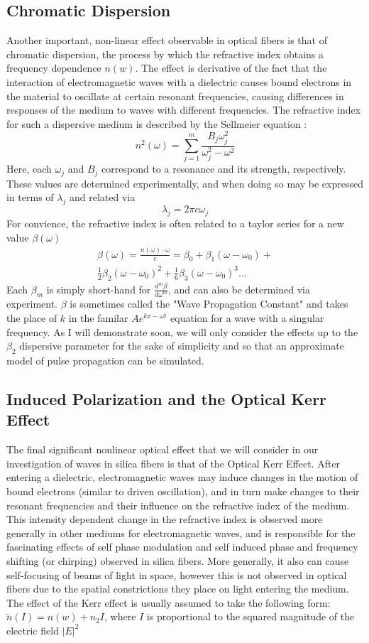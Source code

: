 \documentclass[10pt, a4paper, twocolumn]{article} %
\begin{document}
\subsection{Chromatic Dispersion}
Another important, non-linear effect observable in optical fibers is that of chromatic dispersion, the process by which the refractive index obtains a frequency dependence $n(w)$. The effect is derivative of the fact that the interaction of electromagnetic waves with a dielectric causes bound electrons in the material to oscillate at certain resonant frequencies, causing differences in responses of the medium to waves with different frequencies. The refractive index for such a dispersive medium is described by the Sellmeier equation \cite{AgrawalChap2}:
$$n^2(\omega) = \sum_{j=1}^m \frac{B_j \omega_j^2}{\omega_j^2 - \omega^2}$$
Here, each $\omega_j$ and $B_j$ correspond to a resonance and its strength, respectively. These values are determined experimentally, and when doing so may be expressed in terms of $\lambda_j$ and related via 
$$\lambda_j = 2\pi c \omega_j$$
For convience, the refractive index is often related to a taylor series for a new value $\beta(\omega)$
\begin{align*}
    \beta (\omega) = \frac{n(\omega)\cdot\omega}{c} = \beta_0 + \beta_1 (\omega - \omega_0) +\\ \frac{1}{2} \beta_2 (\omega - \omega_0)^2 + \frac{1}{6} \beta_3 (\omega - \omega_0)^3...
\end{align*}
Each $\beta_m$ is simply short-hand for $\frac{d^m\beta}{d\omega ^m}$, and can also be determined via experiment. $\beta$ is sometimes called the "Wave Propagation Constant" and takes the place of $k$ in the familar $A e^{kx - \omega t}$ equation for a wave with a singular frequency. As I will demonstrate soon, we will only consider the effects up to the $\beta_2$ dispersive parameter for the sake of simplicity and so that an approximate model of pulse propagation can be simulated.

\subsection{Induced Polarization and the Optical Kerr Effect}
The final significant nonlinear optical effect that we will consider in our investigation of waves in silica fibers is that of the Optical Kerr Effect. After entering a dielectric, electromagnetic waves may induce changes in the motion of bound electrons (similar to driven oscillation), and in turn make changes to their resonant frequencies and their influence on the refractive index of the medium. This intensity dependent change in the refractive index is observed more generally in other mediums for electromagnetic waves, and is responsible for the fascinating effects of self phase modulation and self induced phase and frequency shifting (or chirping) observed in silica fibers. More generally, it also can cause self-focusing of beams of light in space, however this is not observed in optical fibers due to the spatial constrictions they place on light entering the medium. The effect of the Kerr effect is usually assumed to take the following form:
$\tilde{n}(I) = n(w) + n_2 I$, where $I$ is proportional to the squared magnitude of the electric field $|E|^2$ \cite{AgrawalChap1}
\end{document}
